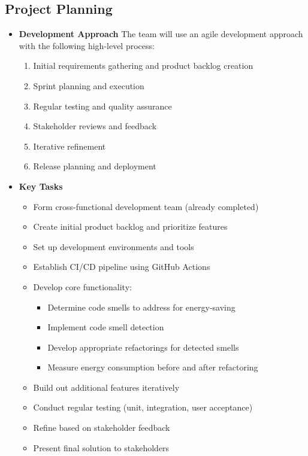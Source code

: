 \documentclass[12pt]{article}
\begin{document}
\subsection{Project Planning}
\begin{itemize}

  \item \textbf{Development Approach}
    The team will use an agile development approach with the
    following high-level process:
    \begin{enumerate}
      \item Initial requirements gathering and product backlog creation
      \item Sprint planning and execution
      \item Regular testing and quality assurance
      \item Stakeholder reviews and feedback
      \item Iterative refinement
      \item Release planning and deployment
    \end{enumerate}

  \item \textbf{Key Tasks}
    \begin{itemize}
      \item Form cross-functional development team (already completed)
      \item Create initial product backlog and prioritize features
      \item Set up development environments and tools
      \item Establish CI/CD pipeline using GitHub Actions
      \item Develop core functionality:
        \begin{itemize}
          \item Determine code smells to address for energy-saving
          \item Implement code smell detection
          \item Develop appropriate refactorings for detected smells
          \item Measure energy consumption before and after refactoring
        \end{itemize}
      \item Build out additional features iteratively
      \item Conduct regular testing (unit, integration, user acceptance)
      \item Refine based on stakeholder feedback
      \item Present final solution to stakeholders


\end{itemize}
\end{itemize}
\end{document}
